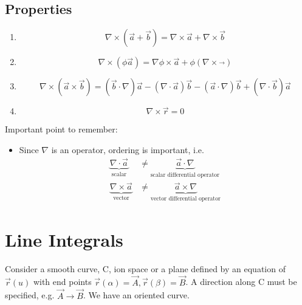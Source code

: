 \documentclass[a4paper, 11pt, normalem]{report}
\newcommand\veru{\vec{r}(u)}
\begin{document}
\subsection{Properties}
\begin{enumerate}
    \item
            \begin{equation*}
                \nabla \times (\vec{a} + \vec{b}) = \nabla \times \vec{a} + \nabla \times \vec{b}
            \end{equation*}
    \item
            \begin{equation*}
                \nabla \times (\phi \vec{a}) = \nabla\phi \times \vec{a} + \phi(\nabla\times\vec{})
            \end{equation*}
    \item
            \begin{equation*}
                \nabla\times(\vec{a}\times\vec{b}) = (\vec{b}\cdot\nabla)\vec{a} - (\nabla\cdot\vec{a})\vec{b} - (\vec{a}\cdot\nabla)\vec{b} + (\nabla\cdot\vec{b})\vec{a}
            \end{equation*}
    \item
            \begin{equation*}
                \nabla \times \vec{r} = 0
            \end{equation*}
\end{enumerate}
Important point to remember:
\begin{itemize}
    \item Since $\nabla$ is an operator, ordering is important, i.e.
            \begin{align*}
                \underbrace{\nabla\cdot\vec{a}}_{\text{scalar}} &\neq \underbrace{\vec{a}\cdot\nabla}_{\text{scalar differential operator}} \\
                \underbrace{\nabla \times \vec{a}}_{\text{vector}} &\neq \underbrace{\vec{a}\times\nabla}_{\text{vector differential operator}}
            \end{align*}
\end{itemize}

\section{Line Integrals}
Consider a smooth curve, C, ion space or a plane defined by an equation of $\veru$ with end points $\vec{r}(\alpha) = \vec{A}, \vec{r}(\beta) = \vec{B}$.
A direction along C must be specified, e.g. $\vec{A} \to \vec{B}$. We have an oriented curve.
\end{document}
